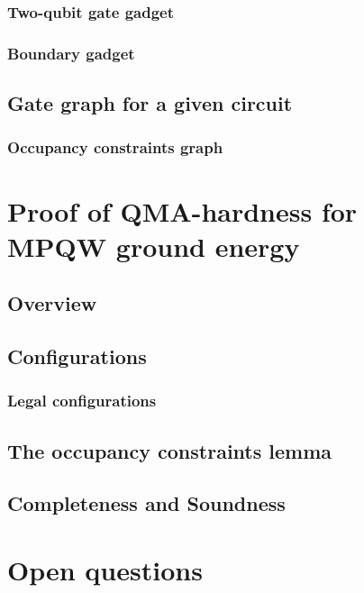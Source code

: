 \subsubsection{Two-qubit gate gadget}

\subsubsection{Boundary gadget}

\subsection{Gate graph for a given circuit}
\subsubsection{Occupancy constraints graph}

\section{Proof of QMA-hardness for MPQW ground energy}

\subsection{Overview}

\subsection{Configurations}

\subsubsection{Legal configurations}

\subsection{The occupancy constraints lemma}

\subsection{Completeness and Soundness}

\section{Open questions}
